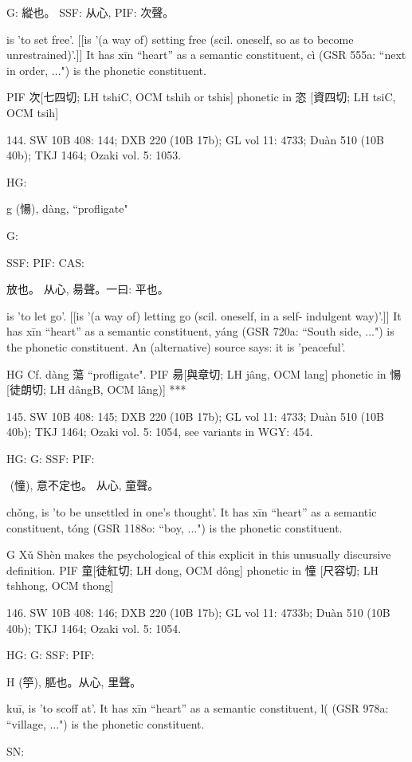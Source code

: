G:	縱也。
SSF: 从心,
PIF: 次聲。

is 'to set free'. [[is '(a way of) setting free (scil. oneself, so as to become unrestrained)'.]]
It has xīn ``heart'' as a semantic constituent,
cì (GSR 555a: ``next in order, ...") is the phonetic constituent.

PIF     次[七四切; LH tshiC, OCM tshih or tshis] phonetic in 恣 [資四切; LH tsiC, OCM tsih]

144. SW 10B 408: 144; DXB 220 (10B 17b); GL vol 11: 4733; Duàn 510 (10B 40b); TKJ 1464; Ozaki vol. 5: 1053.


HG:

g (愓), dàng, ``profligate"

G:

SSF: PIF: CAS:

放也。
从心, 昜聲。一曰: 平也。

is 'to let go'. [[is '(a way of) letting go (scil. oneself, in a self- indulgent way)'.]]
It has xīn ``heart'' as a semantic constituent,
yáng (GSR 720a: ``South side, ...") is the phonetic constituent. An (alternative) source says:
it is 'peaceful'.

HG     Cf. dàng 蕩 ``profligate".
PIF     昜[與章切; LH jâng, OCM lang] phonetic in 愓 [徒朗切; LH dângB, OCM lâng)]
***



145. SW 10B 408: 145; DXB 220 (10B 17b); GL vol 11: 4733; Duàn 510 (10B 40b); TKJ 1464; Ozaki vol. 5: 1054, see
variants in WGY: 454.


HG:
G:
SSF: PIF:

 (憧),
意不定也。
从心, 童聲。


chǒng,
is 'to be unsettled in one's thought'.
It has xīn ``heart'' as a semantic constituent,
tóng (GSR 1188o: ``boy, ...") is the phonetic constituent.

G	Xǔ Shèn makes the psychological of this explicit in this unusually discursive definition.
PIF     童[徒紅切; LH dong, OCM dông] phonetic in 憧 [尺容切; LH tshhong, OCM thong]

146. SW 10B 408: 146; DXB 220 (10B 17b); GL vol 11: 4733b; Duàn 510 (10B 40b); TKJ 1464; Ozaki vol. 5: 1054.


HG:
G: SSF: PIF:

H (䇡),
䏘也。从心, 里聲。


kuī,
is 'to scoff at'.
It has xīn ``heart'' as a semantic constituent,
l( (GSR 978a: ``village, ...") is the phonetic constituent.

SN:

